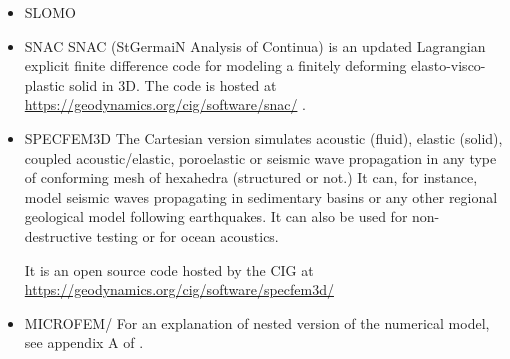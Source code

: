 \begin{itemize}
\item {\codefont SLOMO} 

{\small
\noindent
\cite{kaus05}
\cite{kasb08}
}

\item {\codefont SNAC} 
SNAC (StGermaiN Analysis of Continua) is an updated Lagrangian explicit finite 
difference code for modeling a finitely deforming elasto-visco-plastic solid in 3D.
The code is hosted at \url{https://geodynamics.org/cig/software/snac/} .

\begin{scriptsize}
\cite{chlg08}
\cite{chgu08}
\cite{qula10}
\cite{chss11}
\end{scriptsize}


\item {\codefont SPECFEM3D} 
The Cartesian version simulates acoustic (fluid), elastic (solid), coupled acoustic/elastic, 
poroelastic or seismic wave propagation in any type of conforming mesh of hexahedra 
(structured or not.) It can, for instance, model seismic waves propagating in sedimentary 
basins or any other regional geological model following earthquakes. It can also be used 
for non-destructive testing or for ocean acoustics. 

It is an open source code hosted by the CIG at 
\url{https://geodynamics.org/cig/software/specfem3d/}

{\small
\noindent
\cite{kott05}
}

\item {\codefont MICROFEM}/\sopale
{}
For an explanation of nested version of the numerical model, see appendix A of \cite{webe18}.


\end{itemize}
